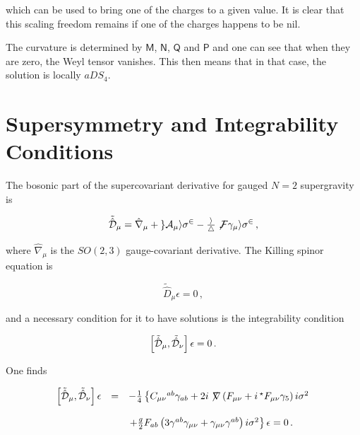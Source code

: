 \documentclass[12pt,a4paper]{article}
\begin{document}
\noindent which can be used to bring one of the charges to a given value. 
It is clear that this scaling freedom remains if one of the charges
happens to be nil.

The curvature is determined by $\mathsf{M}$, $\mathsf{N}$,
$\mathsf{Q}$ and $\mathsf{P}$ and one can see that when they are zero,
the Weyl tensor vanishes.  This then means that in that case, the
solution is locally $aDS_{4}$.


\section{Supersymmetry and Integrability Conditions}
\label{sec-susy-KN-TN}

The bosonic part of the supercovariant derivative for gauged $N=2$
supergravity is

\begin{equation}
\tilde{\hat{\cal D}}_{\mu}=
\hat{\nabla}_{\mu}  +gA_{\mu}i\sigma^{2}
-{\textstyle\frac{i}{4}}\not\!F\gamma_{\mu}i\sigma^{2}\, ,
\end{equation}

\noindent where $\hat{\nabla}_{\mu}$ is the $SO(2,3)$ 
gauge-covariant derivative.  The Killing spinor equation is

\begin{equation}
\tilde{\hat{D}}_{\mu}\epsilon=0\, ,
\end{equation}

\noindent and a necessary condition for it to have solutions is the
integrability condition

\begin{equation}
\left[\tilde{\hat{\cal D}}_{\mu},\tilde{\hat{\cal D}}_{\nu}\right]  
\epsilon=0\, .
\end{equation}

\noindent One finds \cite{art:Ro}

\begin{equation}
\label{eq:integrability}
\begin{array}{rcl}
\left[\tilde{\hat{\cal D}}_{\mu},\tilde{\hat{\cal D}}_{\nu}\right]  
\epsilon
& = & -{\textstyle\frac{1}{4}} 
\left\{ C_{\mu\nu}{}^{ab} \gamma_{ab}
+2i\not\!\nabla \left(F_{\mu\nu} +i\, {}^{\star}F_{\mu\nu}\gamma_{5} \right)
i\sigma^{2}\right.\\
& & \\
& & 
\left.
+{\textstyle\frac{g}{2}} F_{ab}\left(3\gamma^{ab}\gamma_{\mu\nu}
+\gamma_{\mu\nu}\gamma^{ab}\right)i\sigma^{2}
\right\}\epsilon=0\, .\\
\end{array}
\end{equation}
\end{document}
